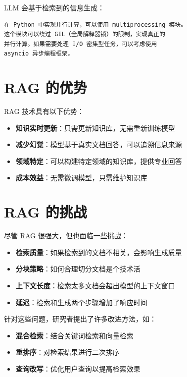 LLM 会基于检索到的信息生成：

\begin{verbatim}
在 Python 中实现并行计算，可以使用 multiprocessing 模块。
这个模块可以绕过 GIL（全局解释器锁）的限制，实现真正的
并行计算。如果需要处理 I/O 密集型任务，可以考虑使用
asyncio 异步编程框架。
\end{verbatim}

\section{RAG 的优势}

RAG 技术具有以下优势：

\begin{itemize}
    \item \textbf{知识实时更新}：只需更新知识库，无需重新训练模型
    \item \textbf{减少幻觉}：模型基于真实文档回答，可以追溯信息来源
    \item \textbf{领域特定}：可以构建特定领域的知识库，提供专业回答
    \item \textbf{成本效益}：无需微调模型，只需维护知识库
\end{itemize}

\section{RAG 的挑战}

尽管 RAG 很强大，但也面临一些挑战：

\begin{itemize}
    \item \textbf{检索质量}：如果检索到的文档不相关，会影响生成质量
    \item \textbf{分块策略}：如何合理切分文档是个技术活
    \item \textbf{上下文长度}：检索太多文档会超出模型的上下文窗口
    \item \textbf{延迟}：检索和生成两个步骤增加了响应时间
\end{itemize}

针对这些问题，研究者提出了许多改进方法，如：
\begin{itemize}
    \item \textbf{混合检索}：结合关键词检索和向量检索
    \item \textbf{重排序}：对检索结果进行二次排序
    \item \textbf{查询改写}：优化用户查询以提高检索效果
\end{itemize}
